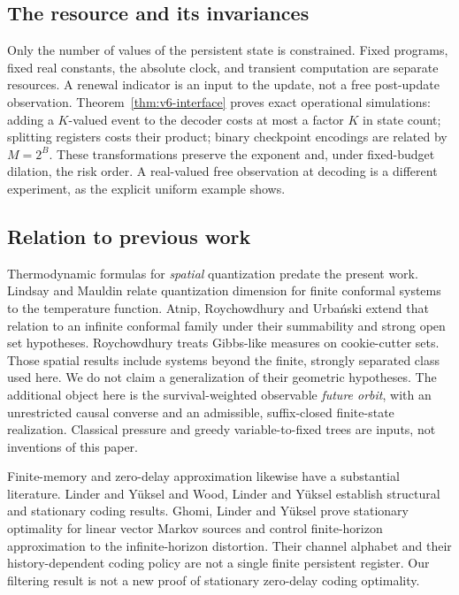 \subsection{The resource and its invariances}
Only the number of values of the persistent state is constrained.
Fixed programs, fixed real constants, the absolute clock, and
transient computation are separate resources. A renewal indicator is
an input to the update, not a free post-update observation.
Theorem~\ref{thm:v6-interface} proves exact operational simulations:
adding a $K$-valued event to the decoder costs at most a factor $K$
in state count; splitting registers costs their product; binary
checkpoint encodings are related by $M=2^B$. These transformations
preserve the exponent and, under fixed-budget dilation, the risk
order. A real-valued free observation at decoding is a different
experiment, as the explicit uniform example shows.

\subsection{Relation to previous work}
Thermodynamic formulas for \emph{spatial} quantization predate the
present work. Lindsay and Mauldin \cite{LindsayMauldin2002} relate
quantization dimension for finite conformal systems to the temperature
function. Atnip, Roychowdhury and Urba\'nski
\cite[Theorem 3.1]{AtnipRoychowdhuryUrbanski2018} extend that relation
to an infinite conformal family under their summability and strong
open set hypotheses. Roychowdhury \cite{Roychowdhury2014} treats
Gibbs-like measures on cookie-cutter sets. Those spatial results
include systems beyond the finite, strongly separated class used
here. We do not claim a generalization of their geometric hypotheses.
The additional object here is the survival-weighted observable
\emph{future orbit}, with an unrestricted causal converse and an
admissible, suffix-closed finite-state realization. Classical pressure
and greedy variable-to-fixed trees \cite{Bowen2008,Tunstall1967} are
inputs, not inventions of this paper.

Finite-memory and zero-delay approximation likewise have a substantial
literature. Linder and Y\"uksel \cite{LinderYuksel2014} and Wood, Linder
and Y\"uksel \cite{WoodLinderYuksel2017} establish structural and
stationary coding results. Ghomi, Linder and Y\"uksel
\cite[Theorem 4]{GhomiLinderYuksel2022} prove stationary optimality
for linear vector Markov sources and control finite-horizon
approximation to the infinite-horizon distortion. Their channel
alphabet and their history-dependent coding policy are not a single
finite persistent register. Our filtering result is not a new proof
of stationary zero-delay coding optimality.

